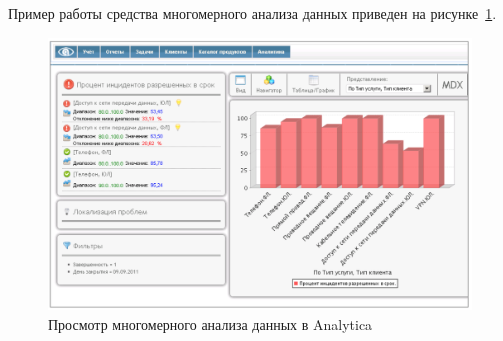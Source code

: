 Пример работы средства многомерного анализа данных приведен
на рисунке~\ref{fig:m}.
\begin{figure}[h]
  \centering
  \includegraphics[scale=0.18]{fig/m}
  \caption{Просмотр многомерного анализа данных в Analytica}
  \label{fig:m}
\end{figure}

